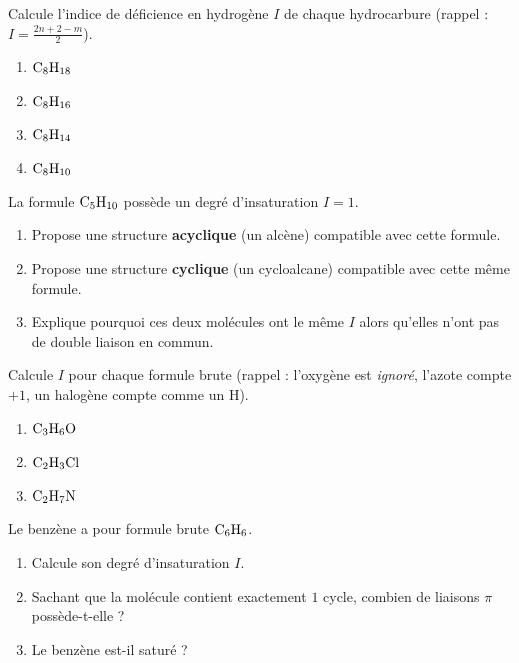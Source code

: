 \documentclass[11pt,a4paper]{article}
\begin{document}
\begin{exo}
Calcule l'indice de déficience en hydrogène $I$ de chaque hydrocarbure (rappel : $I=\frac{2n+2-m}{2}$).
\begin{enumerate}[label=\alph*)]
  \item $\ce{C8H18}$
  \item $\ce{C8H16}$
  \item $\ce{C8H14}$
  \item $\ce{C8H10}$
\end{enumerate}
\end{exo}

\begin{exo}
La formule $\ce{C5H10}$ possède un degré d'insaturation $I=1$.
\begin{enumerate}[label=\alph*)]
  \item Propose une structure \textbf{acyclique} (un alcène) compatible avec cette formule.
  \item Propose une structure \textbf{cyclique} (un cycloalcane) compatible avec cette même formule.
  \item Explique pourquoi ces deux molécules ont le même $I$ alors qu'elles n'ont pas de double liaison en commun.
\end{enumerate}
\end{exo}

\begin{exo}
Calcule $I$ pour chaque formule brute (rappel : l'oxygène est \emph{ignoré}, l'azote compte $+1$, un halogène compte comme un H).
\begin{enumerate}[label=\alph*)]
  \item $\ce{C3H6O}$
  \item $\ce{C2H3Cl}$
  \item $\ce{C2H7N}$
\end{enumerate}
\end{exo}

\begin{exo}
Le benzène a pour formule brute $\ce{C6H6}$.
\begin{enumerate}[label=\alph*)]
  \item Calcule son degré d'insaturation $I$.
  \item Sachant que la molécule contient exactement $1$ cycle, combien de liaisons $\pi$ possède-t-elle ?
  \item Le benzène est-il saturé ?
\end{enumerate}
\end{exo}
\end{document}
